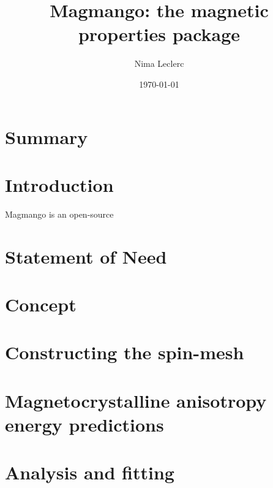 \documentclass{article}
\title{Magmango: the magnetic properties package}
\author{Nima Leclerc}
\date{\today}
\begin{document}
\maketitle


\section*{Summary}
\justifying



\section*{Introduction}
\justifying
Magmango is an open-source 

\section*{Statement of Need}
\justifying


\section*{Concept}
\justifying



\section*{Constructing the spin-mesh}
\justifying


\section*{Magnetocrystalline anisotropy energy predictions} 
\justifying



\section*{Analysis and fitting} 
\justifying
\end{document}
